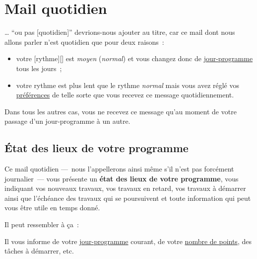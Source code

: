 % 
% 
% 
% 
% 
% 
% 
% 

\section{Mail quotidien}\hypertarget{mail-quotidien}{}\label{mail-quotidien}

… ``ou pas [quotidien]'' devrions-nous ajouter au titre, car ce mail dont nous allons parler n'est quotidien que pour deux raisons~{}:

\begin{itemize}
\item votre [rythme][] est \emph{moyen} (\emph{normal}) et vous changez donc de \hyperlink{explicationjourprogrammejourreel}{jour-programme} tous les jours~{};
\item votre rythme est plus lent que le rythme \emph{normal} mais vous avez réglé vos \hyperlink{preferences-auteur}{préférences} de telle sorte que vous recevez ce message quotidiennement.
\end{itemize}

Dans tous les autres cas, vous ne recevez ce message qu'au moment de votre passage d'un jour-programme à un autre.

\subsection{État des lieux de votre programme}\hypertarget{tat-des-lieux-de-votre-programme}{}\label{tat-des-lieux-de-votre-programme}

Ce mail quotidien —~{}nous l'appellerons ainsi même s'il n'est pas forcément journalier~{}— vous présente un \textbf{état des lieux de votre programme}, vous indiquant vos nouveaux travaux, vos travaux en retard, vos travaux à démarrer ainsi que l'échéance des travaux qui se poursuivent et toute information qui peut vous être utile en temps donné.

Il peut ressembler à ça~{}:

\begin{center}
\end{center}

Il vous informe de votre \hyperlink{explicationjourprogrammejourreel}{jour-programme} courant, de votre \hyperlink{explication-nombre-points}{nombre de points}, des tâches à démarrer, etc.

